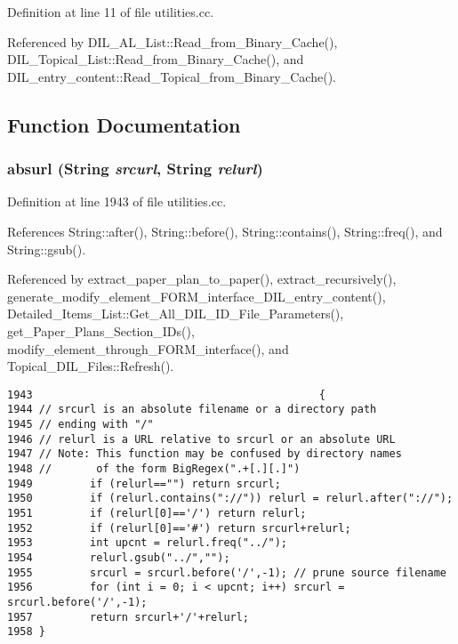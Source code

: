 Definition at line 11 of file utilities.cc.

Referenced by DIL\_\-AL\_\-List::Read\_\-from\_\-Binary\_\-Cache(), DIL\_\-Topical\_\-List::Read\_\-from\_\-Binary\_\-Cache(), and DIL\_\-entry\_\-content::Read\_\-Topical\_\-from\_\-Binary\_\-Cache().

\subsection{Function Documentation}
\subsubsection{ absurl ({\bf String} {\em srcurl}, {\bf String} {\em relurl})}\label{utilities_8cc_a31}




Definition at line 1943 of file utilities.cc.

References String::after(), String::before(), String::contains(), String::freq(), and String::gsub().

Referenced by extract\_\-paper\_\-plan\_\-to\_\-paper(), extract\_\-recursively(), generate\_\-modify\_\-element\_\-FORM\_\-interface\_\-DIL\_\-entry\_\-content(), Detailed\_\-Items\_\-List::Get\_\-All\_\-DIL\_\-ID\_\-File\_\-Parameters(), get\_\-Paper\_\-Plans\_\-Section\_\-IDs(), modify\_\-element\_\-through\_\-FORM\_\-interface(), and Topical\_\-DIL\_\-Files::Refresh().



\footnotesize\begin{verbatim}1943                                             {
1944 // srcurl is an absolute filename or a directory path
1945 // ending with "/"
1946 // relurl is a URL relative to srcurl or an absolute URL
1947 // Note: This function may be confused by directory names
1948 //       of the form BigRegex(".+[.][.]")
1949         if (relurl=="") return srcurl;
1950         if (relurl.contains("://")) relurl = relurl.after("://");
1951         if (relurl[0]=='/') return relurl;
1952         if (relurl[0]=='#') return srcurl+relurl;
1953         int upcnt = relurl.freq("../");
1954         relurl.gsub("../","");
1955         srcurl = srcurl.before('/',-1); // prune source filename
1956         for (int i = 0; i < upcnt; i++) srcurl = srcurl.before('/',-1);
1957         return srcurl+'/'+relurl;
1958 }
\end{verbatim}\normalsize 
{}
